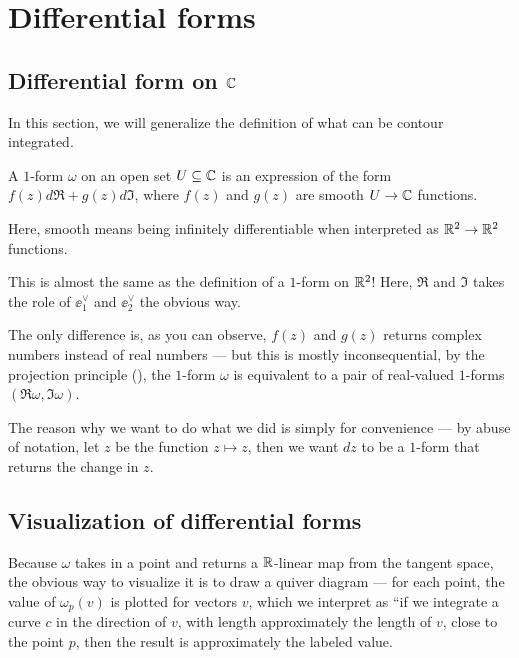 \chapter{Differential forms}
\label{ch:forms_riemann}

\section{Differential form on $\mathbb C$}

In this section, we will generalize the definition of what can be contour integrated.

\begin{definition}
	A $1$-form $\omega$ on an open set $U \subseteq \mathbb C$ is an expression of the form
	$f(z) d \Re + g(z) d \Im$, where $f(z)$ and $g(z)$ are
	smooth $U \to \mathbb C$ functions.
\end{definition}

Here, smooth means being infinitely differentiable when interpreted as $\mathbb R^2 \to \mathbb R^2$ functions.

This is almost the same as the definition of a $1$-form on $\mathbb R^2$!
Here, $\Re$ and $\Im$ takes the role of $\ee_1^\vee$ and $\ee_2^\vee$ the obvious way.

The only difference is, as you can observe, $f(z)$ and $g(z)$ returns complex numbers instead of
real numbers --- but this is mostly inconsequential, by the projection principle
(), the $1$-form $\omega$ is equivalent to a pair of real-valued
$1$-forms $(\Re \omega, \Im \omega)$.

The reason why we want to do what we did is simply for convenience --- by abuse of notation,
let $z$ be the function $z \mapsto z$,
then we want $dz$ to be a $1$-form that returns the change in $z$.

\section{Visualization of differential forms}

Because $\omega$ takes in a point and returns a $\mathbb R$-linear map from the tangent space,
the obvious way to visualize it is to draw a quiver diagram --- for each point, the value of
$\omega_p(v)$ is plotted for vectors $v$, which we interpret as ``if we integrate a curve $c$ in the
direction of $v$, with length approximately the length of $v$, close to the point $p$, then the
result is approximately the labeled value.


